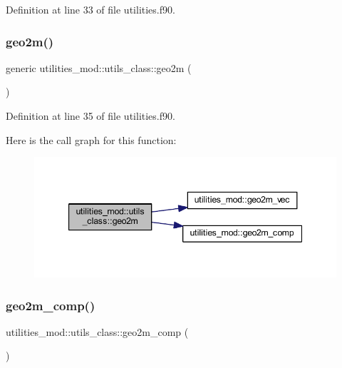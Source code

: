 Definition at line 33 of file utilities.\+f90.

\mbox{\label{structutilities__mod_1_1utils__class_abe6b57e722392dec127bb426c9b0e41f}} 
\subsubsection{\texorpdfstring{geo2m()}{geo2m()}}
{\footnotesize\ttfamily generic utilities\+\_\+mod\+::utils\+\_\+class\+::geo2m (\begin{DoxyParamCaption}{ }\end{DoxyParamCaption})\hspace{0.3cm}{\ttfamily [private]}}



Definition at line 35 of file utilities.\+f90.

Here is the call graph for this function\+:\nopagebreak
\begin{figure}[H]
\begin{center}
\leavevmode
\includegraphics[width=347pt]{structutilities__mod_1_1utils__class_abe6b57e722392dec127bb426c9b0e41f_cgraph}
\end{center}
\end{figure}
\mbox{\label{structutilities__mod_1_1utils__class_ab41bb5a8810e938810f0d08c42c312c9}} 
\subsubsection{\texorpdfstring{geo2m\+\_\+comp()}{geo2m\_comp()}}
{\footnotesize\ttfamily utilities\+\_\+mod\+::utils\+\_\+class\+::geo2m\+\_\+comp (\begin{DoxyParamCaption}{ }\end{DoxyParamCaption})\hspace{0.3cm}{\ttfamily [private]}}



